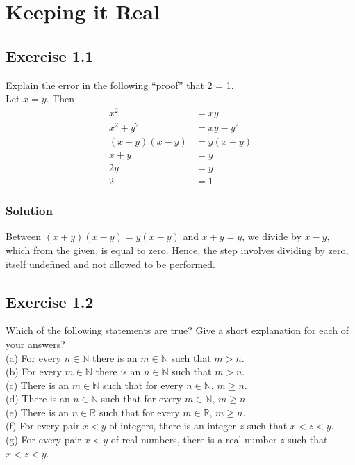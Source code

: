 \documentclass[12pt]{report}
\begin{document}
\renewcommand\qedsymbol{OE$\Delta$}
\newcommand{\abs}[1]{\left| #1 \right|}
\newcommand{\mathif}{\text{if }}
\newcommand{\seq}[2][n]{\ensuremath{(#2 _{#1})}}

\tableofcontents
\pagebreak
\chapter{Keeping it Real}
\section{Exercise 1.1}
Explain the error in the following ``proof'' that 2 = 1.\\
Let $x = y$. Then
\begin{align*}
    x^2 &= xy\\
    x^2 + y^2 &= xy - y^2\\
    (x + y)(x - y) &= y(x - y)\\
    x + y &= y\\
    2y &= y\\
    2 &= 1
\end{align*}

\subsection*{Solution}
Between \((x + y)(x - y) = y(x - y)\) and \(x + y = y\), we divide by \(x - y\), which from the given, is equal to zero. Hence, the step involves dividing by zero, itself undefined and not allowed to be performed.

\pagebreak
\section{Exercise 1.2}
Which of the following statements are true? Give a short explanation for each of your answers?\\
(a) For every $n \in \mathbb{N}$ there is an $m \in \mathbb{N}$ such that $m > n$.\\
(b) For every $m \in \mathbb{N}$ there is an $n \in \mathbb{N}$ such that $m > n$.\\
(c) There is an $m \in \mathbb{N}$ such that for every $n \in \mathbb{N}$, $m \ge n$.\\
(d) There is an $n \in \mathbb{N}$ such that for every $m \in \mathbb{N}$, $m \ge n$.\\
(e) There is an $n \in \mathbb{R}$ such that for every $m \in \mathbb{R}$, $m \ge n$.\\
(f) For every pair $x < y$ of integers, there is an integer $z$ such that $x < z < y$.\\
(g) For every pair $x < y$ of real numbers, there is a real number $z$ such that $x < z < y$.
\end{document}
